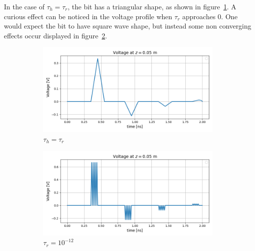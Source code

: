 In the case of $\tau_h = \tau_r$, the bit has a triangular shape, as shown in figure~\ref{fig:sub1}. A curious effect can be noticed in the voltage profile when $\tau_r$ approaches 0. One would expect the bit to have square wave shape, but instead some non converging effects occur displayed in figure~\ref{fig:sub2}.

\begin{figure}[! h]
\centering
\begin{subfigure}{.5\textwidth}
  \centering
  \includegraphics[width=.9\linewidth]{figures/tau_h_equals_tau_r.png}
  \caption{$\tau_h = \tau_r$}
  \label{fig:sub1}
\end{subfigure}%
\begin{subfigure}{.5\textwidth}
  \centering
  \includegraphics[width=.9\linewidth]{figures/tau_r naar 0.png}
  \caption{$\tau_r = 10^{-12}$}
  \label{fig:sub2}
\end{subfigure}
\caption{}
\label{fig:test}
\end{figure}